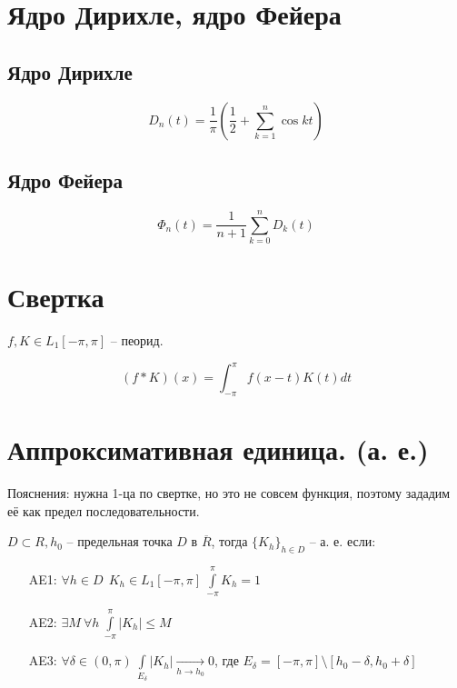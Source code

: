	\begin{center}
	\end{center}

	\section{Ядро Дирихле, ядро Фейера}

	\subsection{Ядро Дирихле}

	$$ D_n(t) = \frac{1}{\pi}( \frac{1}{2} + \sum_{k = 1}^{n} \cos kt) $$

	\subsection{Ядро Фейера}

	$$ \Phi_n(t) = \frac{1}{n+1} \sum_{k = 0}^{n} D_k(t) $$

	\section{Свертка}

	$ f, K \in L_1[-\pi, \pi]$  -- пеорид.

	$$ (f \ast K)(x) = \int_{-\pi}^{\pi} f(x-t)K(t) dt$$

    \section{Аппроксимативная единица. (а. е.)}
        
        Пояснения: нужна 1-ца по свертке, но это не совсем функция, поэтому зададим её как предел последовательности.
        
        $ D \subset R, h_0 $ -- предельная точка $ D $ в $ \overline{R} $, 
        тогда $ \{K_h\}_{h \in D}$ -- а. е. если:
        \begin{itemize}
            \item[AE1: ] $ \forall h \in D ~~ K_h \in L_1[-\pi, \pi] ~ \int\limits_{-\pi}^{\pi} K_h = 1 $
            \item[AE2: ] $ \exists M ~ \forall h ~ \int\limits_{-\pi}^{\pi} |K_h| \leq M $
            \item[AE3: ] $ \forall \delta \in (0, \pi) ~  \int\limits_{E_\delta} | K_h | 
            \underset{h \rightarrow h_0}{\rightarrow} 0  $, где $E_{\delta} = [-\pi,\pi] \setminus [h_0 - \delta, h_0 + \delta]$
        \end{itemize}
        
